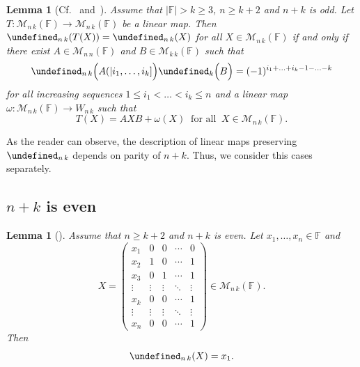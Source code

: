\documentclass{elsarticle}
\let\det\undefined
\DeclareMathOperator{\det}{det}
\def\F{{\mathbb F}}
\def\M{{\mathcal M}}
\newtheorem{lemma}[theorem]{Lemma}
\theoremstyle{definition}
\numberwithin{equation}{section}
\begin{document}
\begin{lemma}[{Cf.~\cite[Theorem~4.12]{Guterman2025b} and~\cite[Theorem~5.16]{Guterman2025c}}]\label{thm:THMNPLUSKODD}\label{lem:THMNPLUSKODDKALL}Assume that $|\F| > k \ge 3$, $n \ge k + 2$ and $n + k$ is odd. Let $T\colon \M_{n\,k} (\F) \to \M_{n\,k} (\F)$ be a linear map. Then $\det_{n\, k} (T(X)) = \det_{n\,k}(X)$ for all $X \in \M_{n\,k} (\F)$ if and only if  there exist $A \in \M_{n\, n}(\F)$ and $B \in \M_{k\, k}(\F)$ such that
\begin{equation}\label{thm:MainTheoremCullisNKOdd:eqq}
\det_{n\,k} \Bigl(A(|i_1,\ldots, i_k]\Bigr) \det_k \Bigl(B\Bigr) = (-1)^{i_1 + \ldots + i_k - 1 - \ldots - k}
\end{equation}
for all increasing sequences $1 \le i_1 < \ldots < i_k \le n $ and a linear map\linebreak $\omega\colon \M_{n\,k}(\F) \to W_{n\,k}$ such that
\begin{equation}\label{thm:MainTheoremCullisNKOdd:eq}
T(X) = AXB + \omega(X)\;\;\mbox{for all}\;\;X \in \M_{n\,k} (\F).
\end{equation}
\end{lemma}

As the reader can observe, the description of linear maps preserving $\det_{n\,k}$ depends on parity of $n + k$. Thus, we consider this cases separately.

\subsection{$n + k$ is even}


\begin{lemma}[{\cite[Lemma~4.1]{Guterman2025}}]\label{lem:DetNKXiEqX1}Assume that $n \ge k + 2$ and $n+k$ is even. Let $x_1, \ldots, x_n \in \F$ and
\[
X = \begin{pmatrix}
x_1 & 0 & 0 & \cdots & 0\\
x_2 & 1 & 0 &\cdots & 1\\
x_3 & 0 & 1 &\cdots & 1\\
\vdots & \vdots & \vdots & \ddots & \vdots\\
x_k & 0 & 0 & \cdots & 1\\
\vdots & \vdots & \vdots & \ddots & \vdots\\
x_{n} & 0 & 0 & \cdots & 1
\end{pmatrix} \in \M_{n\,k}(\F).
\]
Then
\[
\det_{n\,k}(X) = x_1.
\]
\end{lemma}
\end{document}
